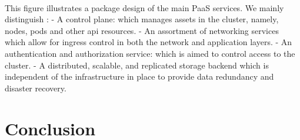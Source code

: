 \paragraph{}This figure illustrates a package design of the main PaaS services. We mainly distinguish :\newline
-	A control plane: which manages assets in the cluster, namely, nodes, pods and other api resources. \newline
-	An assortment of networking services which allow for ingress control in both the network and application layers.\newline
-	An authentication and authorization service: which is aimed to control access to the cluster.\newline
-	A distributed, scalable, and replicated storage backend which is independent of the infrastructure in place to provide data redundancy and disaster recovery.

\section*{Conclusion}




